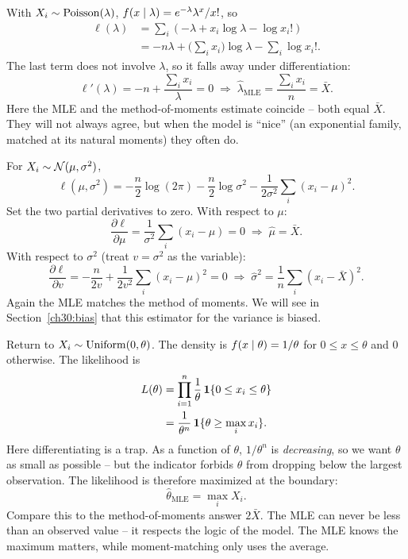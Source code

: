 \begin{example}
\label{ch30:ex-mle-pois}
With $X_i\sim\operatorname{Poisson}(\lambda)$, $f(x\mid\lambda)=e^{-\lambda}\lambda^x/x!$, so
\begin{align*}
  \ell(\lambda) &= \sum_i \left(-\lambda + x_i\log\lambda - \log x_i!\right) \\
  &= -n\lambda + \Big(\sum_i x_i\Big)\log\lambda - \sum_i \log x_i!.
\end{align*}
The last term does not involve $\lambda$, so it falls away under
differentiation:
\[
  \ell'(\lambda) = -n + \frac{\sum_i x_i}{\lambda} = 0
  \;\Longrightarrow\;
  \hat\lambda_{\mathrm{MLE}} = \frac{\sum_i x_i}{n} = \bar X.
\]
Here the MLE and the method-of-moments estimate coincide -- both equal $\bar X$.
They will not always agree, but when the model is ``nice'' (an exponential
family, matched at its natural moments) they often do.
\end{example}

\begin{example}
\label{ch30:ex-mle-normal}
For $X_i\sim\mathcal{N}(\mu,\sigma^2)$,
\[
  \ell(\mu,\sigma^2)
  = -\frac{n}{2}\log(2\pi) - \frac{n}{2}\log\sigma^2
    - \frac{1}{2\sigma^2}\sum_i (x_i-\mu)^2.
\]
Set the two partial derivatives to zero. With respect to $\mu$:
\[
  \frac{\partial\ell}{\partial\mu}
  = \frac{1}{\sigma^2}\sum_i (x_i-\mu) = 0
  \;\Longrightarrow\;
  \hat\mu = \bar X.
\]
With respect to $\sigma^2$ (treat $v=\sigma^2$ as the variable):
\[
  \frac{\partial\ell}{\partial v}
  = -\frac{n}{2v} + \frac{1}{2v^2}\sum_i (x_i-\mu)^2 = 0
  \;\Longrightarrow\;
  \hat\sigma^2 = \frac1n\sum_i (x_i-\bar X)^2.
\]
Again the MLE matches the method of moments. We will see in Section~\ref{ch30:bias} that this estimator for the variance is biased.
\end{example}

\begin{example}
\label{ch30:ex-mle-unif}
Return to $X_i\sim\operatorname{Uniform}(0,\theta)$. The density is $f(x\mid\theta)=1/\theta$
for $0\le x\le\theta$ and $0$ otherwise. The likelihood is
\begin{align*}
  L(\theta) &= \prod_{i=1}^n \frac{1}{\theta}\,\mathbf{1}\{0\le x_i\le\theta\} \\
            &= \frac{1}{\theta^n}\,\mathbf{1}\{\theta \ge \max_i x_i\}.
\end{align*}
Here differentiating is a trap. As a function of $\theta$, $1/\theta^n$ is
\emph{decreasing}, so we want $\theta$ as small as possible -- but the indicator
forbids $\theta$ from dropping below the largest observation. The likelihood is
therefore maximized at the boundary:
\[
  \boxed{\;\hat\theta_{\mathrm{MLE}} = \max_i X_i.\;}
\]
Compare this to the method-of-moments answer $2\bar X$. The MLE can never be
less than an observed value -- it respects the logic of the model. The MLE
knows the maximum matters, while moment-matching only uses the average.
\end{example}

